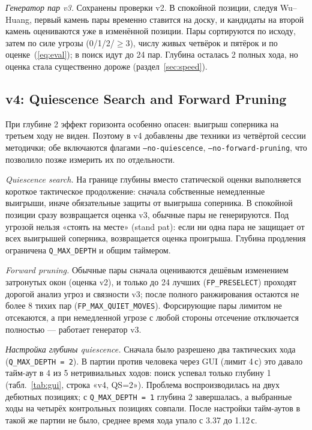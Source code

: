 \documentclass[a4paper,10pt,twocolumn]{article}
\newcommand{\code}[1]{\texttt{#1}}
\begin{document}
\emph{Генератор пар v3.} Сохранены проверки v2. В спокойной позиции, следуя Wu--Huang, первый камень пары временно ставится на доску, и кандидаты на второй камень оцениваются уже в изменённой позиции. Пары сортируются по исходу, затем по силе угрозы (0/1/2/$\ge3$), числу живых четвёрок и пятёрок и по оценке~(\ref{eq:eval}); в поиск идут до 24 пар. Глубина осталась 2 полных хода, но оценка стала существенно дороже (раздел~\ref{sec:speed}).

\subsection{v4: Quiescence Search and Forward Pruning}\label{sec:v4}
При глубине 2 эффект горизонта особенно опасен: выигрыш соперника на третьем ходу не виден. Поэтому в v4 добавлены две техники из четвёртой сессии методички; обе включаются флагами \code{--no-quiescence}, \code{--no-forward-pruning}, что позволило позже измерить их по отдельности.

\emph{Quiescence search.} На границе глубины вместо статической оценки выполняется короткое тактическое продолжение: сначала собственные немедленные выигрыши, иначе обязательные защиты от выигрыша соперника. В спокойной позиции сразу возвращается оценка v3, обычные пары не генерируются. Под угрозой нельзя «стоять на месте» (stand pat): если ни одна пара не защищает от всех выигрышей соперника, возвращается оценка проигрыша. Глубина продления ограничена \code{Q\_MAX\_DEPTH} и общим таймером.

\emph{Forward pruning.} Обычные пары сначала оцениваются дешёвым изменением затронутых окон (оценка v2), и только до 24 лучших (\code{FP\_PRESELECT}) проходят дорогой анализ угроз и связности v3; после полного ранжирования остаются не более 8 тихих пар (\code{FP\_MAX\_QUIET\_MOVES}). Форсирующие пары лимитом не отсекаются, а при немедленной угрозе с любой стороны отсечение отключается полностью --- работает генератор v3.

\emph{Настройка глубины quiescence.} Сначала было разрешено два тактических хода (\code{Q\_MAX\_DEPTH = 2}). В партии против человека через GUI (лимит 4\,с) это давало тайм-аут в 4 из 5 нетривиальных ходов: поиск успевал только глубину 1 (табл.~\ref{tab:gui}, строка «v4, QS=2»). Проблема воспроизводилась на двух дебютных позициях; с \code{Q\_MAX\_DEPTH = 1} глубина 2 завершалась, а выбранные ходы на четырёх контрольных позициях совпали. После настройки тайм-аутов в такой же партии не было, среднее время хода упало с 3.37 до 1.12\,с.
\end{document}
